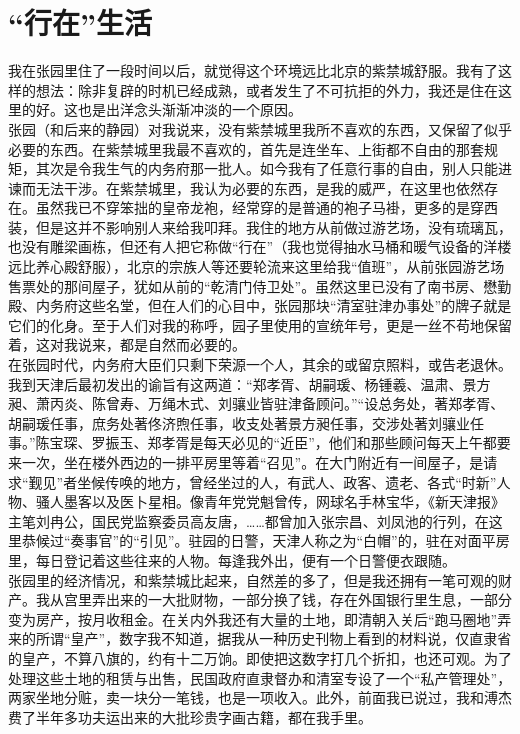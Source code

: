 \fancyhead[RO]{} %
\fancyhead[LE]{} %
\chapter*{“行在”生活}
\thispagestyle{empty}
我在张园里住了一段时间以后，就觉得这个环境远比北京的紫禁城舒服。我有了这样的想法：除非复辟的时机已经成熟，或者发生了不可抗拒的外力，我还是住在这里的好。这也是出洋念头渐渐冲淡的一个原因。\\

张园（和后来的静园）对我说来，没有紫禁城里我所不喜欢的东西，又保留了似乎必要的东西。在紫禁城里我最不喜欢的，首先是连坐车、上街都不自由的那套规矩，其次是令我生气的内务府那一批人。如今我有了任意行事的自由，别人只能进谏而无法干涉。在紫禁城里，我认为必要的东西，是我的威严，在这里也依然存在。虽然我已不穿笨拙的皇帝龙袍，经常穿的是普通的袍子马褂，更多的是穿西装，但是这并不影响别人来给我叩拜。我住的地方从前做过游艺场，没有琉璃瓦，也没有雕梁画栋，但还有人把它称做“行在”（我也觉得抽水马桶和暖气设备的洋楼远比养心殿舒服），北京的宗族人等还要轮流来这里给我“值班”，从前张园游艺场售票处的那间屋子，犹如从前的“乾清门侍卫处”。虽然这里已没有了南书房、懋勤殿、内务府这些名堂，但在人们的心目中，张园那块“清室驻津办事处”的牌子就是它们的化身。至于人们对我的称呼，园子里使用的宣统年号，更是一丝不苟地保留着，这对我说来，都是自然而必要的。\\

在张园时代，内务府大臣们只剩下荣源一个人，其余的或留京照料，或告老退休。我到天津后最初发出的谕旨有这两道：“郑孝胥、胡嗣瑗、杨锺羲、温肃、景方昶、萧丙炎、陈曾寿、万绳木式、刘骧业皆驻津备顾问。”“设总务处，著郑孝胥、胡嗣瑗任事，庶务处著佟济煦任事，收支处著景方昶任事，交涉处著刘骧业任事。”陈宝琛、罗振玉、郑孝胥是每天必见的“近臣”，他们和那些顾问每天上午都要来一次，坐在楼外西边的一排平房里等着“召见”。在大门附近有一间屋子，是请求“觐见”者坐候传唤的地方，曾经坐过的人，有武人、政客、遗老、各式“时新”人物、骚人墨客以及医卜星相。像青年党党魁曾传，网球名手林宝华，《新天津报》主笔刘冉公，国民党监察委员高友唐，……都曾加入张宗昌、刘凤池的行列，在这里恭候过“奏事官”的“引见”。驻园的日警，天津人称之为“白帽”的，驻在对面平房里，每日登记着这些往来的人物。每逢我外出，便有一个日警便衣跟随。\\

张园里的经济情况，和紫禁城比起来，自然差的多了，但是我还拥有一笔可观的财产。我从宫里弄出来的一大批财物，一部分换了钱，存在外国银行里生息，一部分变为房产，按月收租金。在关内外我还有大量的土地，即清朝入关后“跑马圈地”弄来的所谓“皇产”，数字我不知道，据我从一种历史刊物上看到的材料说，仅直隶省的皇产，不算八旗的，约有十二万饷。即使把这数字打几个折扣，也还可观。为了处理这些土地的租赁与出售，民国政府直隶督办和清室专设了一个“私产管理处”，两家坐地分赃，卖一块分一笔钱，也是一项收入。此外，前面我已说过，我和溥杰费了半年多功夫运出来的大批珍贵字画古籍，都在我手里。\\

